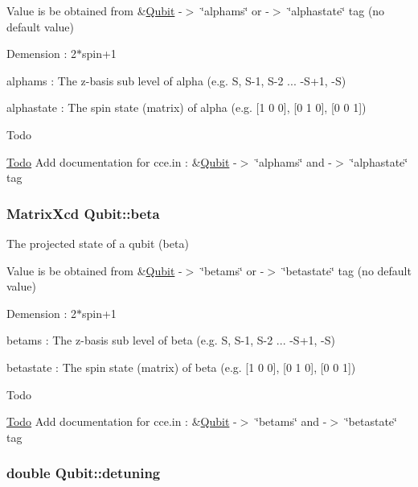 Value is be obtained from \&\hyperlink{structQubit}{Qubit} -\/$>$ \char`\"{}alphams\char`\"{} or -\/$>$ \char`\"{}alphastate\char`\"{} tag (no default value)
\begin{DoxyItemize}
\item Demension \-: 2$\ast$spin+1
\item alphams \-: The z-\/basis sub level of alpha (e.\-g. S, S-\/1, S-\/2 ... -\/\-S+1, -\/\-S)
\item alphastate \-: The spin state (matrix) of alpha (e.\-g. \mbox{[}1 0 0\mbox{]}, \mbox{[}0 1 0\mbox{]}, \mbox{[}0 0 1\mbox{]}) \begin{DoxyRefDesc}{Todo}
\item[\hyperlink{todo__todo000021}{Todo}]Add documentation for cce.\-in \-: \&\hyperlink{structQubit}{Qubit} -\/$>$ \char`\"{}alphams\char`\"{} and -\/$>$ \char`\"{}alphastate\char`\"{} tag \end{DoxyRefDesc}

\end{DoxyItemize}\hypertarget{structQubit_a6c73eb8c49fdb6db06179b21b5a2923d}{
\subsubsection[{beta}]{\setlength{\rightskip}{0pt plus 5cm}Matrix\-Xcd Qubit\-::beta}}\label{structQubit_a6c73eb8c49fdb6db06179b21b5a2923d}


The projected state of a qubit (beta) 

Value is be obtained from \&\hyperlink{structQubit}{Qubit} -\/$>$ \char`\"{}betams\char`\"{} or -\/$>$ \char`\"{}betastate\char`\"{} tag (no default value)
\begin{DoxyItemize}
\item Demension \-: 2$\ast$spin+1
\item betams \-: The z-\/basis sub level of beta (e.\-g. S, S-\/1, S-\/2 ... -\/\-S+1, -\/\-S)
\item betastate \-: The spin state (matrix) of beta (e.\-g. \mbox{[}1 0 0\mbox{]}, \mbox{[}0 1 0\mbox{]}, \mbox{[}0 0 1\mbox{]}) \begin{DoxyRefDesc}{Todo}
\item[\hyperlink{todo__todo000022}{Todo}]Add documentation for cce.\-in \-: \&\hyperlink{structQubit}{Qubit} -\/$>$ \char`\"{}betams\char`\"{} and -\/$>$ \char`\"{}betastate\char`\"{} tag \end{DoxyRefDesc}

\end{DoxyItemize}\hypertarget{structQubit_a6e0e926587994ef24d67431d0dbef9e7}{
\subsubsection[{detuning}]{\setlength{\rightskip}{0pt plus 5cm}double Qubit\-::detuning}}\label{structQubit_a6e0e926587994ef24d67431d0dbef9e7}


